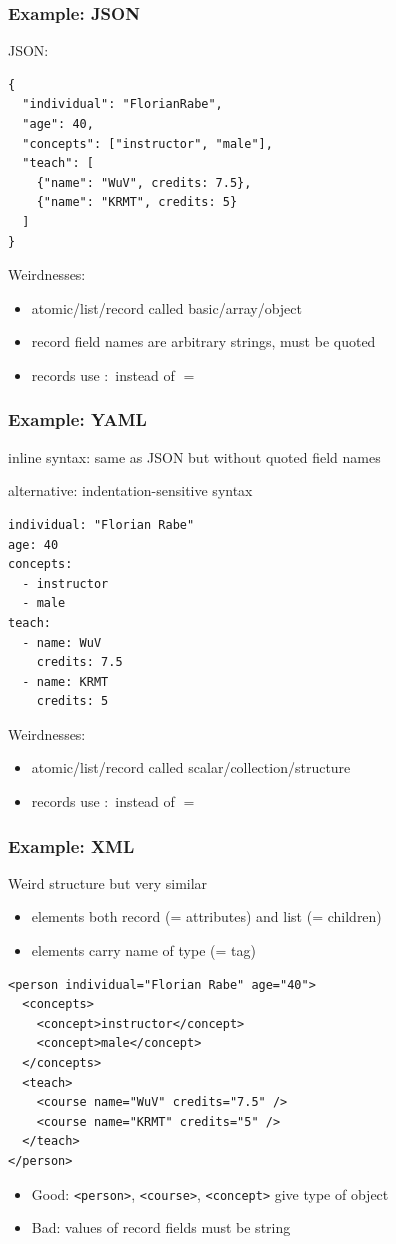 \begin{frame}[fragile]\frametitle{Example: JSON}
JSON:
\begin{lstlisting}[basicstyle=\footnotesize]
{
  "individual": "FlorianRabe",
  "age": 40,
  "concepts": ["instructor", "male"],
  "teach": [
    {"name": "WuV", credits: 7.5},
    {"name": "KRMT", credits: 5}
  ]
}
\end{lstlisting}

Weirdnesses:
\begin{itemize}
\item atomic/list/record called basic/array/object
\item record field names are arbitrary strings, must be quoted
\item records use $:$ instead of $=$
\end{itemize}
\end{frame}

\begin{frame}[fragile]\frametitle{Example: YAML}
inline syntax: same as JSON but without quoted field names

alternative: indentation-sensitive syntax
\begin{lstlisting}[basicstyle=\footnotesize]
individual: "Florian Rabe"
age: 40
concepts:
  - instructor
  - male
teach:
  - name: WuV
    credits: 7.5
  - name: KRMT
    credits: 5
\end{lstlisting}

Weirdnesses:
\begin{itemize}
\item atomic/list/record called scalar/collection/structure
\item records use $:$ instead of $=$
\end{itemize}
\end{frame}

\begin{frame}[fragile]\frametitle{Example: XML}
Weird structure but very similar
\begin{itemize}
\item elements both record (= attributes) and list (= children)
\item elements carry name of type (= tag)
\end{itemize}

\begin{lstlisting}[basicstyle=\footnotesize]
<person individual="Florian Rabe" age="40">
  <concepts>
    <concept>instructor</concept>
    <concept>male</concept>
  </concepts>
  <teach>
    <course name="WuV" credits="7.5" />
    <course name="KRMT" credits="5" />
  </teach>
</person>
\end{lstlisting}

\begin{itemize}
\item Good: \lstinline|<person>|, \lstinline|<course>|, \lstinline|<concept>| give type of object
\item Bad: values of record fields must be string
\end{itemize}
\end{frame}

